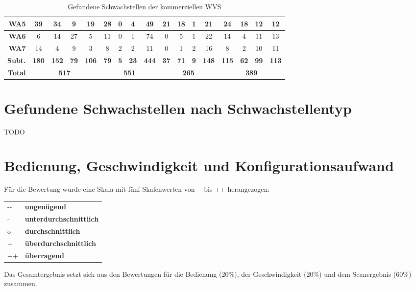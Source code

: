 \documentclass[12pt,oneside,a4paper,parskip]{scrbook}
\begin{document}
\begin{table}[H]
\begin{tabular}{|r|c|c|c|c|c|c|c|c|c|c|c|c|c|c|c|c|}
        \hline
        \textbf{WA5}          & 39           & 34           & 9           & 19           & 28          & 0          & 4           & 49           & 21          & 18          & 1          & 21           & 24           & 18          & 12          & 12            \\
        \hline
        \textbf{WA6}   & 6            & 14           & 27          & 5            & 11          & 0          & 1           & 74           & 0           & 5           & 1          & 22           & 14           & 4           & 11          & 13            \\
        \hline
        \textbf{WA7} & 14           & 4            & 9           & 3            & 8           & 2          & 2           & 11           & 0           & 1           & 2          & 16           & 8            & 2           & 10          & 11            \\
        \hline
        \textbf{Subt.}        & \textbf{180} & \textbf{152} & \textbf{79} & \textbf{106} & \textbf{79} & \textbf{5} & \textbf{23} & \textbf{444} & \textbf{37} & \textbf{71} & \textbf{9} & \textbf{148} & \textbf{115} & \textbf{62} & \textbf{99} & \textbf{113}  \\
        \hline
        \textbf{Total}           & \multicolumn{4}{c|}{\textbf{517}}                        & \multicolumn{4}{c|}{\textbf{551}}                     & \multicolumn{4}{c|}{\textbf{265}}                     & \multicolumn{4}{c|}{\textbf{389}}                        \\
        \hline
      \end{tabular}
      \caption[Gefundene Schwachstellen der kommerziellen WVS]{Gefundene Schwachstellen der kommerziellen WVS}
    \end{table}
  \section{Gefundene Schwachstellen nach Schwachstellentyp}
  TODO
  \section{Bedienung, Geschwindigkeit und Konfigurationsaufwand}
   Für die Bewertung wurde eine Skala mit fünf Skalenwerten von -{}- bis ++ herangezogen:
   \begin{table}[H]
      \begin{tabular}{ll}
      -{}-         & \textbf{ungenügend}             \\
      -            & \textbf{unterdurchschnittlich}  \\
      o            & \textbf{durchschnittlich}       \\
      +            & \textbf{überdurchschnittlich}   \\
      ++           & \textbf{überragend}
      \end{tabular}
    \end{table}
    Das Gesamtergebnis setzt sich aus den Bewertungen für die Bedienung (20\%), der Geschwindigkeit (20\%) und dem Scanergebnis (60\%) zusammen.
\end{document}
